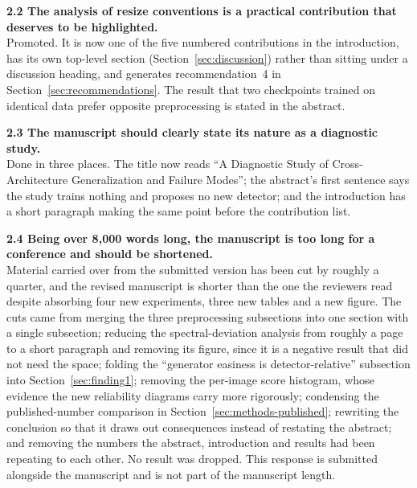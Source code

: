 \documentclass[3p,times,procedia]{elsarticle}
\begin{document}
\noindent\textbf{2.2 The analysis of resize conventions is a practical
contribution that deserves to be highlighted.}\\[1pt]
Promoted. It is now one of the five numbered contributions in the
introduction, has its own top-level section
(Section~\ref{sec:discussion}) rather than sitting under a discussion
heading, and generates recommendation~4 in
Section~\ref{sec:recommendations}. The result that two checkpoints trained
on identical data prefer opposite preprocessing is stated in the abstract.

\noindent\textbf{2.3 The manuscript should clearly state its nature as a
diagnostic study.}\\[1pt]
Done in three places. The title now reads ``A Diagnostic Study of
Cross-Architecture Generalization and Failure Modes''; the abstract's first
sentence says the study trains nothing and proposes no new detector; and
the introduction has a short paragraph making the same point before the
contribution list.

\noindent\textbf{2.4 Being over 8,000 words long, the manuscript is too
long for a conference and should be shortened.}\\[1pt]
Material carried over from the submitted version has been cut by roughly a
quarter, and the revised manuscript is shorter than the one the reviewers
read despite absorbing four new experiments, three new tables and a new
figure. The cuts came from merging the three preprocessing subsections
into one section with a single subsection; reducing the spectral-deviation
analysis from roughly a page to a short paragraph and removing its figure,
since it is a negative result that did not need the space; folding the
``generator easiness is detector-relative'' subsection into Section~\ref{sec:finding1};
removing the per-image score histogram, whose evidence the new reliability
diagrams carry more rigorously; condensing the published-number comparison
in Section~\ref{sec:methods-published}; rewriting the conclusion so that it draws out consequences
instead of restating the abstract; and removing the numbers the abstract,
introduction and results had been repeating to each other. No result was
dropped. This response is submitted
alongside the manuscript and is not part of the manuscript length.
\end{document}
